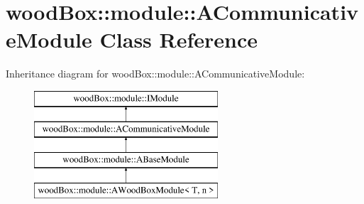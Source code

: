 \hypertarget{classwood_box_1_1module_1_1_a_communicative_module}{}\section{wood\+Box\+:\+:module\+:\+:A\+Communicative\+Module Class Reference}
\label{classwood_box_1_1module_1_1_a_communicative_module}
Inheritance diagram for wood\+Box\+:\+:module\+:\+:A\+Communicative\+Module\+:\begin{figure}[H]
\begin{center}
\leavevmode
\includegraphics[height=4.000000cm]{classwood_box_1_1module_1_1_a_communicative_module}
\end{center}
\end{figure}
